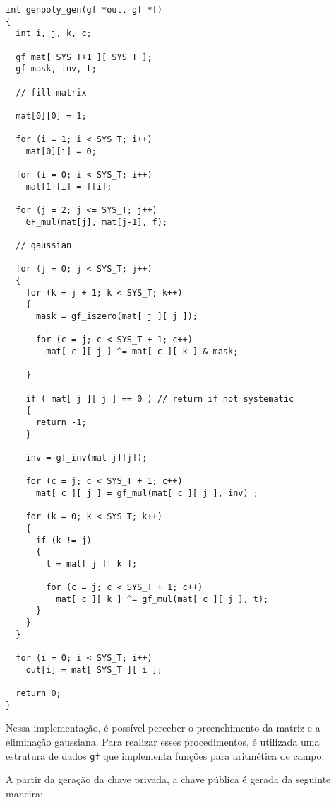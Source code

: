 \begin{verbatim}
int genpoly_gen(gf *out, gf *f)
{
  int i, j, k, c;

  gf mat[ SYS_T+1 ][ SYS_T ];
  gf mask, inv, t;

  // fill matrix

  mat[0][0] = 1;

  for (i = 1; i < SYS_T; i++)
    mat[0][i] = 0;

  for (i = 0; i < SYS_T; i++)
    mat[1][i] = f[i];

  for (j = 2; j <= SYS_T; j++)
    GF_mul(mat[j], mat[j-1], f);

  // gaussian

  for (j = 0; j < SYS_T; j++)
  {
    for (k = j + 1; k < SYS_T; k++)
    {
      mask = gf_iszero(mat[ j ][ j ]);

      for (c = j; c < SYS_T + 1; c++)
        mat[ c ][ j ] ^= mat[ c ][ k ] & mask;

    }

    if ( mat[ j ][ j ] == 0 ) // return if not systematic
    {
      return -1;
    }

    inv = gf_inv(mat[j][j]);

    for (c = j; c < SYS_T + 1; c++)
      mat[ c ][ j ] = gf_mul(mat[ c ][ j ], inv) ;

    for (k = 0; k < SYS_T; k++)
    {
      if (k != j)
      {
        t = mat[ j ][ k ];

        for (c = j; c < SYS_T + 1; c++)
          mat[ c ][ k ] ^= gf_mul(mat[ c ][ j ], t);
      }
    }
  }

  for (i = 0; i < SYS_T; i++)
    out[i] = mat[ SYS_T ][ i ];

  return 0;
}
\end{verbatim}

Nessa implementação, é possível perceber o preenchimento da matriz e a eliminação gaussiana. Para realizar esses procedimentos, é utilizada uma estrutura de dados \texttt{gf} que implementa funções para aritmética de campo.

A partir da geração da chave privada, a chave pública é gerada da seguinte maneira:

